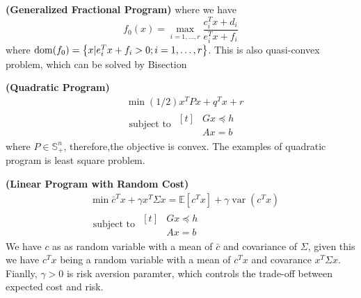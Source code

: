 \begin{definition}{\textbf{(Generalized Fractional Program)}}
    where we have
    \begin{equation*}
        f_0(x) = \max_{i=1,\dots,r}\frac{c_i^Tx+d_i}{e^T_ix+f_i}
    \end{equation*}
    where $\operatorname{dom}(f_0) = \left\{ x | e_i^Tx + f_i > 0 ; i=1,\dots,r \right\}$. This is also quasi-convex problem, which can be solved by Bisection
\end{definition}


\begin{definition}{\textbf{(Quadratic Program)}}
    \begin{equation*}
    \begin{aligned}
        &\min (1/2)x^TPx + q^Tx + r \\
        &\text{ subject to } \begin{aligned}[t]
            &Gx\preceq h\\
            &Ax=b
        \end{aligned}
    \end{aligned}
    \end{equation*}
    where $P \in \mathbb{S}^n_+$, therefore,the objective is convex. The examples of quadratic program is least square problem. 
\end{definition}

\begin{definition}{\textbf{(Linear Program with Random Cost)}}
    \begin{equation*}
    \begin{aligned}
        &\min \bar{c}^Tx + \gamma x^T\Sigma x = \mathbb{E}[c^Tx] + \gamma \operatorname{var}(c^Tx) \\
        &\text{ subject to } \begin{aligned}[t]
            &Gx\preceq h\\
            &Ax=b
        \end{aligned}
    \end{aligned}
    \end{equation*}
    We have $c$ as as random variable with a mean of $\bar{c}$ and covariance of $\Sigma$, given this we have $c^Tx$ being a random variable with a mean of $c^Tx$ and covarance $x^T\Sigma x$. Fianlly, $\gamma>0$ is risk aversion paramter, which controls the trade-off between expected cost and risk.
\end{definition}

